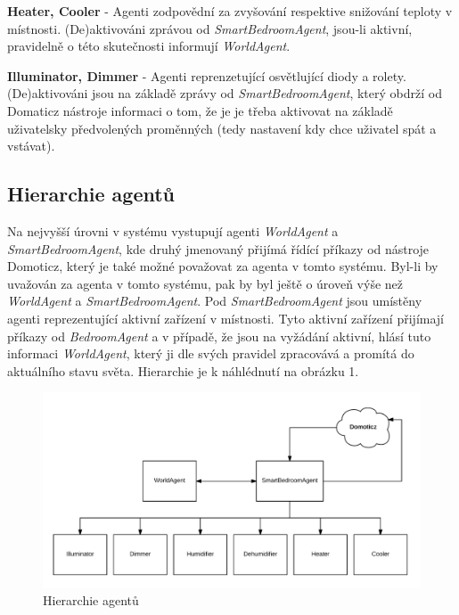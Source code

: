 \documentclass[a4paper,12pt]{article}
\begin{document}
    \textbf{Heater, Cooler} - Agenti zodpovědní za zvyšování respektive snižování teploty v místnosti. (De)aktivováni zprávou od \textit{SmartBedroomAgent}, jsou-li aktivní, pravidelně o této skutečnosti informují \textit{WorldAgent}.
    
    \textbf{Illuminator, Dimmer} - Agenti reprenzetující osvětlující diody a rolety. (De)aktivováni jsou na základě zprávy od \textit{SmartBedroomAgent}, který obdrží od Domaticz nástroje informaci o tom, že je je třeba aktivovat na základě uživatelsky předvolených proměnných (tedy nastavení kdy chce uživatel spát a vstávat).

    \subsection{Hierarchie agentů}
    Na nejvyšší úrovni v systému vystupují agenti \textit{WorldAgent} a \textit{SmartBedroomAgent}, kde druhý jmenovaný přijímá řídící příkazy od nástroje Domoticz, který je také možné považovat za agenta v tomto systému. Byl-li by uvažován za agenta v tomto systému, pak by byl ještě o úroveň výše než \textit{WorldAgent} a \textit{SmartBedroomAgent}. Pod \textit{SmartBedroomAgent} jsou umístěny agenti reprezentující aktivní zařízení v místnosti. Tyto aktivní zařízení přijímají příkazy od \textit{BedroomAgent} a v případě, že jsou na vyžádání aktivní, hlásí tuto informaci \textit{WorldAgent}, který ji dle svých pravidel zpracovává a promítá do aktuálního stavu světa. Hierarchie je k náhlédnutí na obrázku 1.

    \begin{figure}[h!]
        \includegraphics[scale=0.22]{resources/AgentHierarchy.png}
        \caption{Hierarchie agentů}
    \end{figure}


	
\end{document}
